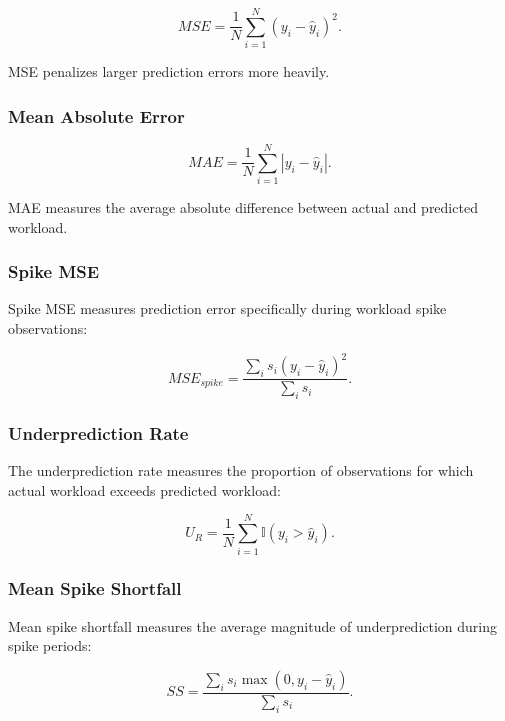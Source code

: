 \documentclass[conference]{IEEEtran}
\begin{document}
\begin{equation}
MSE=\frac{1}{N}\sum_{i=1}^{N}(y_i-\hat{y}_i)^2.
\end{equation}

MSE penalizes larger prediction errors more heavily.

\subsubsection{Mean Absolute Error}

\begin{equation}
MAE=\frac{1}{N}\sum_{i=1}^{N}|y_i-\hat{y}_i|.
\end{equation}

MAE measures the average absolute difference between actual and predicted workload.

\subsubsection{Spike MSE}

Spike MSE measures prediction error specifically during workload spike observations:

\begin{equation}
MSE_{spike}=
\frac{\sum_i s_i(y_i-\hat{y}_i)^2}
{\sum_i s_i}.
\end{equation}

\subsubsection{Underprediction Rate}

The underprediction rate measures the proportion of observations for which actual workload exceeds predicted workload:

\begin{equation}
U_R=
\frac{1}{N}
\sum_{i=1}^{N}
\mathbb{I}(y_i>\hat{y}_i).
\end{equation}

\subsubsection{Mean Spike Shortfall}

Mean spike shortfall measures the average magnitude of underprediction during spike periods:

\begin{equation}
SS=
\frac{\sum_i s_i\max(0,y_i-\hat{y}_i)}
{\sum_i s_i}.
\end{equation}
\end{document}
